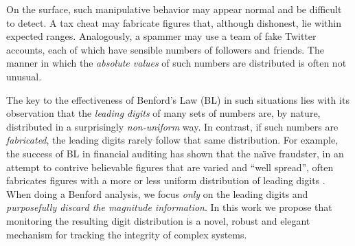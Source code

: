 \documentclass[twoside,leqno,twocolumn]{article}\usepackage[]{graphicx}\usepackage[]{color}
\begin{document}
On the surface, such manipulative behavior may appear normal and be difficult to detect. A tax cheat may fabricate figures that, although dishonest, lie within expected ranges. Analogously, a spammer may use a team of fake Twitter accounts, each of which have sensible numbers of followers and friends. The manner in which the \textit{absolute values} of such numbers are distributed is often not unusual.

The key to the effectiveness of Benford's Law (BL) in such situations lies with its observation that the \textit{leading digits} of many sets of numbers are, by nature, distributed in a surprisingly \textit{non-uniform} way. In contrast, if such numbers are \textit{fabricated}, the leading digits rarely follow that same distribution. For example, the success of BL in financial auditing has shown that the na\"{\i}ve fraudster, in an attempt to contrive believable figures that are varied and ``well spread'', often fabricates figures with a more or less uniform distribution of leading digits \cite{nigrini2012}. When doing a Benford analysis, we focus \textit{only} on the leading digits and \textit{purposefully discard the magnitude information}. In this work we propose that monitoring the resulting digit distribution is a novel, robust and elegant mechanism for tracking the integrity of complex systems.
\end{document}
